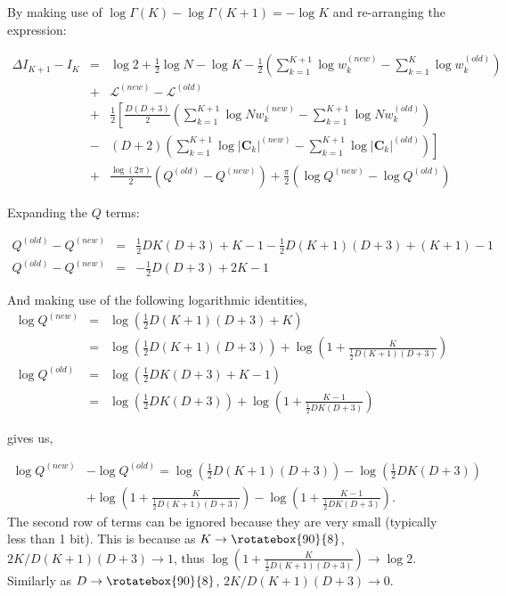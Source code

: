 \documentclass{elsarticle}
\newcommand{\vect}[1]{\boldsymbol{\mathbf{#1}}}
\def\infinity{\rotatebox{90}{8}}
\def\cov{C}
\def\veccov{\vect{\cov}}
\begin{document}
\noindent{}By making use of $\log{\Gamma(K)} - \log{\Gamma(K + 1)} = -\log{K}$ and re-arranging the expression:

\begin{eqnarray}
\Delta{}I_{K+1} - I_K &=& \log{2} %
    + \frac{1}{2}\log{N} - \log{K} - \frac{1}{2}\left(\sum_{k=1}^{K+1}\log{w_k^{(new)}} - \sum_{k=1}^{K}\log{w_k^{(old)}}\right) \nonumber \\ %
& +& \mathcal{L}^{(new)} - \mathcal{L}^{(old)} \nonumber \\ %
& +& \frac{1}{2}\left[\frac{D(D+3)}{2}\left(\sum_{k=1}^{K+1}\log{Nw_k^{(new)} - \sum_{k=1}^{K+1}\log{Nw_k^{(old)}}} \right) \right.\nonumber\\
&-& \left.\left(D+2\right)\left(\sum_{k=1}^{K+1}\log{|\veccov_k|^{(new)}} - \sum_{k=1}^{K+1}\log{|\veccov_k|^{(old)}}\right)\right] \nonumber \\
& +& \frac{\log(2\pi)}{2}(Q^{(old)} - Q^{(new)}) + \frac{\pi}{2}\left(\log{Q^{(new)}} - \log{Q^{(old)}}\right)
\label{eq:13}
\end{eqnarray}

Expanding the $Q$ terms:

\begin{eqnarray}
Q^{(old)} - Q^{(new)} &=& \frac{1}{2}DK(D + 3) + K - 1 - \frac{1}{2}D(K + 1)(D + 3) + (K + 1) - 1 \nonumber \\
Q^{(old)} - Q^{(new)} &=& -\frac{1}{2}D(D+3) + 2K  - 1
\label{eq:14}
\end{eqnarray}

\noindent{}And making use of the following logarithmic identities,
\begin{eqnarray}
  \log{Q^{(new)}} &=& \log{\left(\frac{1}{2}D(K+1)(D + 3) + K\right)} \nonumber \\
                  &=& \log{\left(\frac{1}{2}D(K+1)(D + 3)\right)} + \log{\left(1 + \frac{K}{\frac{1}{2}D(K+1)(D + 3)}\right)} \\
  \log{Q^{(old)}} &=& \log{\left(\frac{1}{2}DK(D + 3) + K - 1\right)} \nonumber \\
                  &=& \log{\left(\frac{1}{2}DK(D + 3)\right)} + \log{\left(1 + \frac{K - 1}{\frac{1}{2}DK(D + 3)}\right)}
\end{eqnarray}


\noindent{}gives us,

\begin{eqnarray}
  \log{Q^{(new)}} &- \log{Q^{(old)}} = \log{\left(\frac{1}{2}D(K+1)(D + 3)\right)} - \log{\left(\frac{1}{2}DK(D + 3)\right)} \nonumber \\
                                    &+ \log{\left(1 + \frac{K}{\frac{1}{2}D(K+1)(D + 3)}\right)} - \log{\left(1 + \frac{K - 1}{\frac{1}{2}DK(D + 3)}\right)}.
\end{eqnarray}
The second row of terms can be ignored because they are very small (typically less than 1 bit). This is because as $K \rightarrow \infinity$, $2K/D(K+1)(D+3) \rightarrow 1$, thus $\log{\left(1 + \frac{K}{\frac{1}{2}D(K+1)(D + 3)}\right)} \rightarrow \log{2}$. Similarly as $D \rightarrow \infinity$, $2K/D(K+1)(D+3) \rightarrow 0$.
\end{document}
